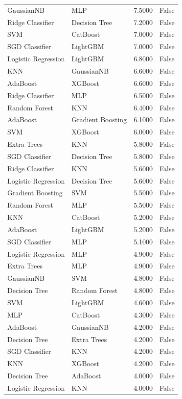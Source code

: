 \begin{tabular}{llrr}
GaussianNB & MLP & 7.5000 & False \\
Ridge Classifier & Decision Tree & 7.2000 & False \\
SVM & CatBoost & 7.0000 & False \\
SGD Classifier & LightGBM & 7.0000 & False \\
Logistic Regression & LightGBM & 6.8000 & False \\
KNN & GaussianNB & 6.6000 & False \\
AdaBoost & XGBoost & 6.6000 & False \\
Ridge Classifier & MLP & 6.5000 & False \\
Random Forest & KNN & 6.4000 & False \\
AdaBoost & Gradient Boosting & 6.1000 & False \\
SVM & XGBoost & 6.0000 & False \\
Extra Trees & KNN & 5.8000 & False \\
SGD Classifier & Decision Tree & 5.8000 & False \\
Ridge Classifier & KNN & 5.6000 & False \\
Logistic Regression & Decision Tree & 5.6000 & False \\
Gradient Boosting & SVM & 5.5000 & False \\
Random Forest & MLP & 5.5000 & False \\
KNN & CatBoost & 5.2000 & False \\
AdaBoost & LightGBM & 5.2000 & False \\
SGD Classifier & MLP & 5.1000 & False \\
Logistic Regression & MLP & 4.9000 & False \\
Extra Trees & MLP & 4.9000 & False \\
GaussianNB & SVM & 4.8000 & False \\
Decision Tree & Random Forest & 4.8000 & False \\
SVM & LightGBM & 4.6000 & False \\
MLP & CatBoost & 4.3000 & False \\
AdaBoost & GaussianNB & 4.2000 & False \\
Decision Tree & Extra Trees & 4.2000 & False \\
SGD Classifier & KNN & 4.2000 & False \\
KNN & XGBoost & 4.2000 & False \\
Decision Tree & AdaBoost & 4.0000 & False \\
Logistic Regression & KNN & 4.0000 & False \\

\end{tabular}

